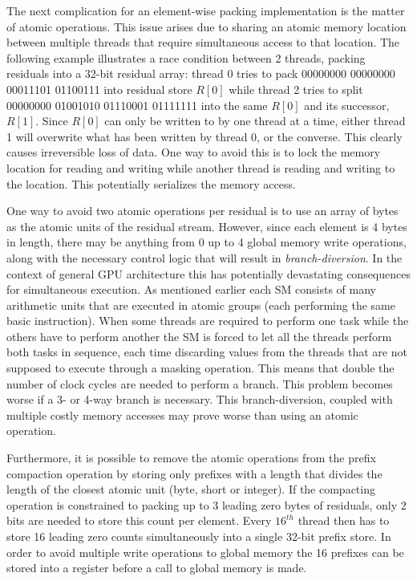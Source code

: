  The next complication for an element-wise packing implementation is the matter of atomic operations. This issue arises due to sharing an atomic memory location between multiple threads that require simultaneous access
 to that location. The following example illustrates a race condition between 2 threads, packing residuals into a 32-bit residual array: thread 0 tries to pack 00000000 00000000 00011101 01100111 into residual store 
 $R[0]$ while thread 2 tries to split 00000000 01001010 01110001 01111111 into the same $R[0]$ and its successor, $R[1]$. Since $R[0]$ can only be written to by one thread at a time, either thread 1 will overwrite what has
 been written by thread 0, or the converse. This clearly causes irreversible loss of data. One way to avoid this is to lock the memory location for reading and writing while another thread is reading and writing to the 
 location. This potentially serializes the memory access.
 
 One way to avoid two atomic operations per residual is to use an array of bytes as the atomic units of the residual stream. However, since each element is 4 bytes in length, there may be anything from 0 up to 4 global memory
 write operations, along with the necessary control logic that will result in \textit{branch-diversion}. In the context of general GPU architecture this has potentially devastating consequences for simultaneous execution. As mentioned
 earlier each SM consists of many arithmetic units that are executed in atomic groups (each performing the same basic instruction). When some threads are required to perform one task while the others have to perform another the
 SM is forced to let all the threads perform both tasks in sequence, each time discarding values from the threads that are not supposed to execute through a masking operation. This means that double the number of clock cycles are needed
 to perform a branch. This problem becomes worse if a 3- or 4-way branch is necessary. This branch-diversion, coupled with multiple costly memory accesses may prove worse than using an atomic operation. 
 
 Furthermore, it is possible to remove the atomic operations from the prefix compaction operation by storing only prefixes with a length that divides the length of the closest atomic unit (byte, short or integer). If the compacting 
 operation is constrained to packing up to 3 leading zero bytes of residuals, only 2 bits are needed to store this count per element. Every $16^{th}$ thread then has to store 16 leading zero counts simultaneously 
 into a single 32-bit prefix store. In order to avoid multiple write operations to global memory the 16 prefixes can be stored into a register before a call to global memory is made.
